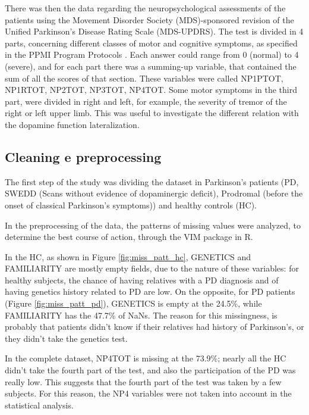 \documentclass[]{article}
\begin{document}
\begin{multicols}{2}
There was then the data regarding the neuropsychological assessments of the patients using the Movement Disorder Society (MDS)-sponsored revision of the Unified Parkinson's Disease Rating Scale (MDS-UPDRS). The test is divided in 4 parts, concerning different classes of motor and cognitive symptoms, as specified in the PPMI Program Protocols \cite{marek_parkinsons_2018}. Each answer could range from 0 (normal) to 4 (severe), and for each part there was a summing-up variable, that contained the sum of all the scores of that section. These variables were called NP1PTOT, NP1RTOT, NP2TOT, NP3TOT, NP4TOT. Some motor symptoms in the third part, were divided in right and left, for example, the severity of tremor of the right or left upper limb. This was useful to investigate the different relation with the dopamine function lateralization.
\newline

\subsection{Cleaning e preprocessing}

The first step of the study was dividing the dataset in Parkinson's patients (PD, SWEDD (Scans without evidence of dopaminergic deficit), Prodromal (before the onset of classical Parkinson's symptoms)) and healthy controls (HC).

In the preprocessing of the data, the patterns of missing values were analyzed, to determine the best course of action, through the VIM package in R. \cite{missing_templ}

In the HC, as shown in Figure \ref{fig:miss_patt_hc}, GENETICS and FAMILIARITY are mostly empty fields, due to the nature of these variables: for healthy subjects, the chance of having relatives with a PD diagnosis and of having genetics history related to PD are low. On the opposite, for PD patients (Figure \ref{fig:miss_patt_pd}), GENETICS is empty at the 24.5\%, while FAMILIARITY has the 47.7\% of NaNs. The reason for this missingness, is probably that patients didn't know if their relatives had history of Parkinson's, or they didn't take the genetics test. 

In the complete dataset, NP4TOT is missing at the 73.9\%; nearly all the HC didn't take the fourth part of the test, and also the participation of the PD was really low. This suggests that the fourth part of the test was taken by a few subjects. For this reason, the NP4 variables were not taken into account in the statistical analysis.


\end{multicols}
\end{document}
